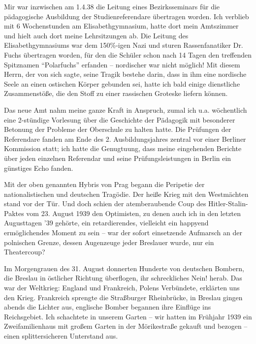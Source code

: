 
Mir war inzwischen am 1.4.38 die Leitung eines Bezirksseminars für die pädagogische Ausbildung der Studienreferendare übertragen worden. Ich verblieb mit 6 Wochenstunden am Elisabethgymnasium, hatte dort mein Amtszimmer und hielt auch dort meine Lehrsitzungen ab. Die Leitung des Elisabethgymnasiums war dem 150\%-igen Nazi und sturen Rassenfanatiker Dr. Fuchs übertragen worden, für den die Schüler schon nach 14 Tagen den treffenden Spitznamen \enquote{Polarfuchs} erfanden -- nordischer war nicht möglich! Mit diesem Herrn, der von sich sagte, seine Tragik bestehe darin, dass in ihm eine nordische Seele an einen ostischen Körper gebunden sei, hatte ich bald einige dienstliche Zusammenstöße, die den Stoff zu einer rassischen Groteske liefern können.

Das neue Amt nahm meine ganze Kraft in Anspruch, zumal ich u.a. wöchentlich eine 2-stündige Vorlesung über die Geschichte der Pädagogik mit besonderer Betonung der Probleme der Oberschule zu halten hatte. Die Prüfungen der Referendare fanden am Ende des 2. Ausbildungsjahres zentral vor einer Berliner Kommission statt; ich hatte die Genugtuung, dass meine eingehenden Berichte über jeden einzelnen Referendar und seine Prüfungsleistungen in Berlin ein günstiges Echo fanden.

Mit der oben genannten Hybris von Prag begann die Peripetie der nationalistischen und deutschen Tragödie. Der heiße Krieg mit den Westmächten stand vor der Tür. Und doch schien der atemberaubende Coup des Hitler-Stalin-Paktes vom 23. August 1939 den Optimisten, zu denen auch ich in den letzten Augusttagen '39 gehörte, ein retardierendes, vielleicht ein happyend ermöglichendes Moment zu sein -- war der sofort einsetzende Aufmarsch an der polnischen Grenze, dessen Augenzeuge jeder Breslauer wurde, nur ein Theatercoup?

Im Morgengrauen des 31. August donnerten Hunderte von deutschen Bombern, die Breslau in östlicher Richtung überflogen, ihr schreckliches Nein! herab. Das war der Weltkrieg: England und Frankreich, Polens Verbündete, erklärten uns den Krieg. Frankreich sprengte die Straßburger Rheinbrücke, in Breslau gingen abends  die Lichter aus, englische Bomber begannen ihre Einflüge ins Reichsgebiet. Ich schachtete in unserem Garten -- wir hatten im Frühjahr 1939 ein Zweifamilienhaus mit großem Garten in der Mörikestraße gekauft und bezogen -- einen splittersicheren Unterstand aus.

